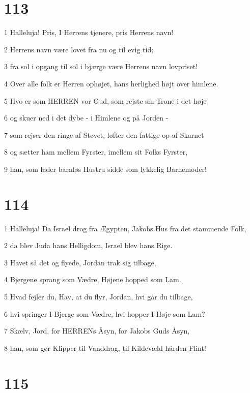 \chapter{113}

\par 1 Halleluja! Pris, I Herrens tjenere, pris Herrens navn!
\par 2 Herrens navn være lovet fra nu og til evig tid;
\par 3 fra sol i opgang til sol i bjærge være Herrens navn lovpriset!
\par 4 Over alle folk er Herren ophøjet, hans herlighed højt over himlene.
\par 5 Hvo er som HERREN vor Gud, som rejste sin Trone i det høje
\par 6 og skuer ned i det dybe - i Himlene og på Jorden -
\par 7 som rejser den ringe af Støvet, løfter den fattige op af Skarnet
\par 8 og sætter ham mellem Fyrster, imellem sit Folks Fyrster,
\par 9 han, som lader barnløs Hustru sidde som lykkelig Barnemoder!

\chapter{114}

\par 1 Halleluja! Da Israel drog fra Ægypten, Jakobs Hus fra det stammende Folk,
\par 2 da blev Juda hans Helligdom, Israel blev hans Rige.
\par 3 Havet så det og flyede, Jordan trak sig tilbage,
\par 4 Bjergene sprang som Vædre, Højene hopped som Lam.
\par 5 Hvad fejler du, Hav, at du flyr, Jordan, hvi går du tilbage,
\par 6 hvi springer I Bjerge som Vædre, hvi hopper I Høje som Lam?
\par 7 Skælv, Jord, for HERRENs Åsyn, for Jakobs Guds Åsyn,
\par 8 han, som gør Klipper til Vanddrag, til Kildevæld hården Flint!

\chapter{115}

